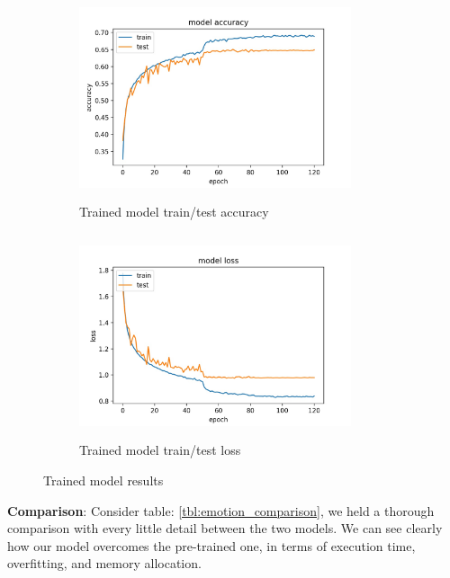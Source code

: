 \begin{figure}
    \begin{subfigure}[b]{0.5\textwidth}
        \includegraphics[width=8cm,height=6cm]{images/emotion_acc_2.jpg}
        \caption{Trained model train/test accuracy}
        \label{fig:emoiton_acc_2}
    \end{subfigure}
    \hfill
    \begin{subfigure}[b]{0.5\textwidth}
        \includegraphics[width=8cm,height=6cm]{images/emotion_loss_2.jpg}
        \caption{Trained model train/test loss}
        \label{fig:emoiton_loss_2}
    \end{subfigure}
    
    \caption{Trained model results}
    \label{fig:emoiton_results_2}
\end{figure}


\textbf{Comparison}: Consider table: \ref{tbl:emotion_comparison}, we held a thorough comparison with every little detail between the two models. We can see clearly how our model overcomes the pre-trained one, in terms of execution time, overfitting, and memory allocation.\\


